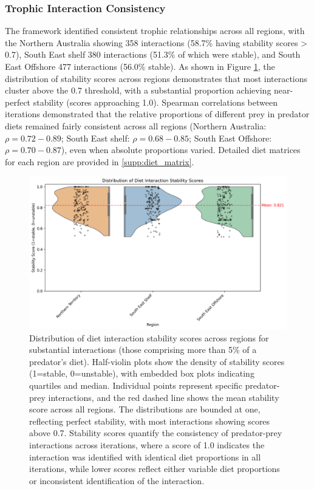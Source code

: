\subsubsection{Trophic Interaction Consistency}
The framework identified consistent trophic relationships across all regions, with the Northern Australia showing 358 interactions (58.7\% having stability scores > 0.7), South East shelf 380 interactions (51.3\% of which were stable), and South East Offshore 477 interactions (56.0\% stable). As shown in Figure \ref{fig:stability_distribution}, the distribution of stability scores across regions demonstrates that most interactions cluster above the 0.7 threshold, with a substantial proportion achieving near-perfect stability (scores approaching 1.0). Spearman correlations between iterations demonstrated that the relative proportions of different prey in predator diets remained fairly consistent across all regions (Northern Australia: $\rho = 0.72-0.89$; South East shelf: $\rho = 0.68-0.85$; South East Offshore: $\rho = 0.70-0.87$), even when absolute proportions varied. Detailed diet matrices for each region are provided in \ref{supp:diet_matrix}.

\begin{figure}[htbp]
    \centering
    \includegraphics[width=\textwidth]{figures/stability_score_distribution.png}
    \caption{Distribution of diet interaction stability scores across regions for substantial interactions (those comprising more than 5\% of a predator's diet). Half-violin plots show the density of stability scores (1=stable, 0=unstable), with embedded box plots indicating quartiles and median. Individual points represent specific predator-prey interactions, and the red dashed line shows the mean stability score across all regions. The distributions are bounded at one, reflecting perfect stability, with most interactions showing scores above 0.7. Stability scores quantify the consistency of predator-prey interactions across iterations, where a score of 1.0 indicates the interaction was identified with identical diet proportions in all iterations, while lower scores reflect either variable diet proportions or inconsistent identification of the interaction. }
    \label{fig:stability_distribution}
\end{figure}

